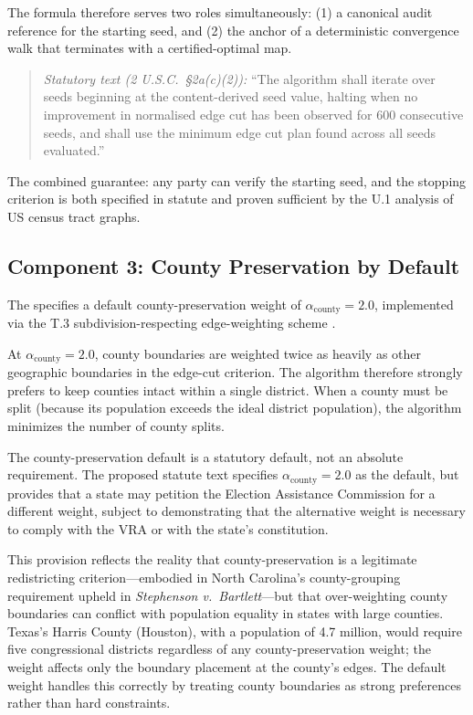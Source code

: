 The formula therefore serves two roles simultaneously:
(1) a canonical audit reference for the starting seed, and
(2) the anchor of a deterministic convergence walk that terminates with
a certified-optimal map.
\begin{quote}
\textit{Statutory text (2 U.S.C.\ §2a(c)(2)):}
``The algorithm shall iterate over seeds beginning at the content-derived
seed value, halting when no improvement in normalised edge cut has been
observed for 600 consecutive seeds, and shall use the minimum edge cut
plan found across all seeds evaluated.''
\end{quote}
\noindent The combined guarantee: any party can verify the starting seed,
and the stopping criterion is both specified in statute and proven sufficient
by the U.1 analysis of US census tract graphs.

\subsection{Component 3: County Preservation by Default}

The \dia{} specifies a default county-preservation weight of $\alpha_\text{county} = 2.0$,
implemented via the T.3 subdivision-respecting edge-weighting scheme \citep{b10paper}.

At $\alpha_\text{county} = 2.0$, county boundaries are weighted twice as
heavily as other geographic boundaries in the edge-cut criterion.
The algorithm therefore strongly prefers to keep counties intact within a
single district.
When a county must be split (because its population exceeds the ideal district
population), the algorithm minimizes the number of county splits.

The county-preservation default is a statutory default, not an absolute
requirement.
The proposed statute text specifies $\alpha_\text{county} = 2.0$ as the
default, but provides that a state may petition the Election Assistance
Commission for a different weight, subject to demonstrating that the
alternative weight is necessary to comply with the VRA or with the
state's constitution.

This provision reflects the reality that county-preservation is a legitimate
redistricting criterion---embodied in North Carolina's county-grouping
requirement upheld in \textit{Stephenson v.\ Bartlett}---but that
over-weighting county boundaries can conflict with population equality
in states with large counties.
Texas's Harris County (Houston), with a population of 4.7 million, would
require five congressional districts regardless of any county-preservation
weight; the weight affects only the boundary placement at the county's
edges.
The default weight handles this correctly by treating county boundaries as
strong preferences rather than hard constraints.


